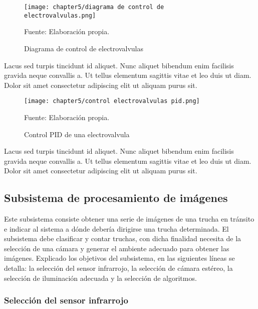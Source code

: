 \begin{itemize}
	
	\begin{figure}[H]
		\centering
		\texttt{[image: chapter5/diagrama de control de electrovalvulas.png]}
		\caption{Diagrama de control de electrovalvulas}
		\begin{myflushleftportland}
			Fuente: Elaboración propia.
		\end{myflushleftportland}
		\label{fig:diagrama de control de electrovalvulas}
	\end{figure}

	Lacus sed turpis tincidunt id aliquet. Nunc aliquet bibendum enim facilisis gravida neque convallis a. Ut tellus elementum sagittis vitae et leo duis ut diam. Dolor sit amet consectetur adipiscing elit ut aliquam purus sit. 
	
	\begin{figure}[H]
		\centering
		\texttt{[image: chapter5/control electrovalvulas pid.png]}
		\caption{Control PID de una electrovalvula}
		\begin{myflushleftportland}
			Fuente: Elaboración propia.
		\end{myflushleftportland}
		\label{fig:control electrovalvulas pid}
	\end{figure}
	
	Lacus sed turpis tincidunt id aliquet. Nunc aliquet bibendum enim facilisis gravida neque convallis a. Ut tellus elementum sagittis vitae et leo duis ut diam. Dolor sit amet consectetur adipiscing elit ut aliquam purus sit. 


\end{itemize}

\subsection{Subsistema de procesamiento de imágenes}

Este subsistema consiste obtener una serie de imágenes de una trucha en tránsito e indicar al sistema a dónde debería dirigirse una trucha determinada. El subsistema debe clasificar y contar truchas, con dicha finalidad necesita de la selección de una cámara y generar el ambiente adecuado para obtener las imágenes. Explicado los objetivos del subsistema, en las siguientes líneas se detalla: la selección del sensor infrarrojo, la selección de cámara estéreo, la selección de iluminación adecuada y la selección de algoritmos.

\subsubsection{Selección del sensor infrarrojo}
\label{sssec:seleccion del sensor infrarrojo}

